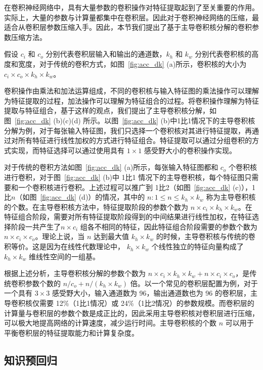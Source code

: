 在卷积神经网络中，具有大量参数的卷积操作对特征提取起到了至关重要的作用。实际上，大量的参数与计算量都集中在卷积层。因此对于卷积神经网络的压缩，最适合从卷积层参数压缩入手。因此，本节我们提出了基于主导卷积核分解的卷积参数压缩方法。

假设 $c_i$ 和 $c_o$ 分别代表卷积层输入和输出的通道数，$k_h$ 和 $k_w$ 分别代表卷积核的高度和宽度，对于传统的卷积方式，如图~\ref{fig:acc_dk} (a)所示，卷积核的大小为 $c_i{\times}c_o{\times}k_h{\times}k_w$。

卷积操作由乘法和加法运算组成，不同的卷积核与输入特征图的乘法操作可以理解为特征提取的过程，加法操作可以理解为特征组合的过程。将卷积操作理解为特征提取与特征组合，基于这样的观点，我们提出了主导卷积核分解，如图~\ref{fig:acc_dk} (b)(c)(d) 所示。以图~\ref{fig:acc_dk} (b)中1比1情况下的主导卷积核分解为例，对于每张输入特征图，我们只选择一个卷积核对其进行特征提取，再通过对所有特征进行线性加权的方式进行特征组合。特征提取可以通过分组卷积的方式实现，而特征选择可以通过使用具有 $1\times1$ 感受野大小的卷积操作实现。

对于传统的卷积方法如图~\ref{fig:acc_dk} (a)所示，每张输入特征图都和 $c_o$ 个卷积核进行卷积，对于图~\ref{fig:acc_dk} (b)中 1比1 情况下的主导卷积核，每个特征图只需要和一个卷积核进行卷积。上述过程可以推广到 1比2（如图~\ref{fig:acc_dk} (c)），1比$n$（如图~\ref{fig:acc_dk} (d)）的情况，其中的 $n: 1{\le}n{\le}k_h{\times}k_w$ 称为主导卷积核的个数。在主导卷积核方法中，特征提取阶段的参数个数为 $n{\times}c_i{\times}k_h{\times}k_w$。在特征组合阶段，需要对所有特征提取阶段得到的中间结果进行线性加权，在特征选择阶段一共产生了$n{\times}c_i$ 组各不相同的特征，因此特征组合阶段需要的参数个数为 $n{\times}c_i{\times}c_o$。理论上说，当 $n$ 达到最大值 $k_h{\times}k_w$ 的时候，主导卷积核与传统的卷积等价。这是因为在线性代数理论中， $k_h{\times}k_w$ 个线性独立的特征向量构成了 $k_h{\times}k_w$ 维线性空间的一组基。

根据上述分析，主导卷积核分解的参数个数为  $n{\times}c_i{\times}k_h{\times}k_w+n{\times}c_i{\times}c_o$，是传统卷积参数个数的 $n/c_o+n/(k_h{\times}k_w)$ 倍。以一个常见的卷积层配置为例，对于一个具有 $3{\times}3$ 感受野大小，输入通道数为 96，输出通道数也为 96 的卷积层，主导卷积核仅需要 12\%（1比1情况）或 24\%（1比2情况）的参数规模。而卷积层的计算量与卷积层的参数个数是成正比的，因此采用主导卷积核对卷积层进行压缩，可以极大地提高网络的计算速度，减少运行时间。主导卷积核的个数 $n$ 可以用于平衡卷积层的特征提取能力和计算复杂度。

\subsection{知识预回归}
\label{sec:acc:model:kp}

